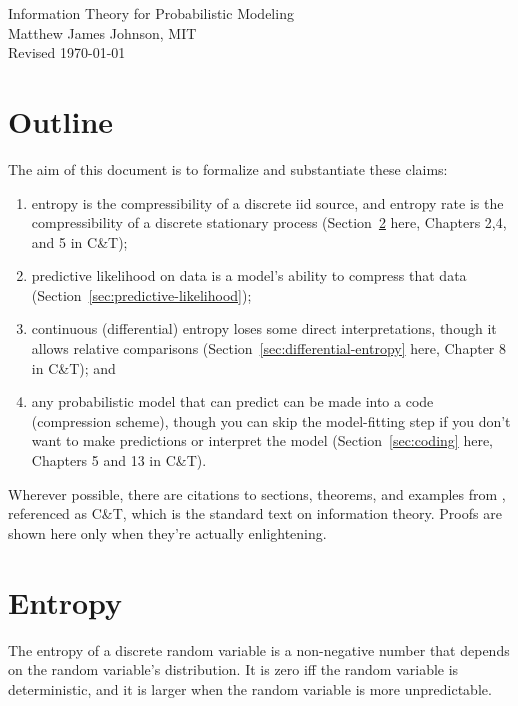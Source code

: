 \documentclass{article}
\begin{document}
    \begin{center}
        \Large
        Information Theory for Probabilistic Modeling\\
        \vspace{0.2in}
        \normalsize
        Matthew James Johnson, MIT\\
        \vspace{0.1in}
        \footnotesize
        Revised \today
    \end{center}

    \section{Outline}

    The aim of this document is to formalize and substantiate these claims:

    \begin{enumerate}
        \item entropy is the compressibility of a discrete iid
            source, and entropy rate is the
            compressibility of a discrete stationary process
            (Section~\ref{sec:entropy} here, Chapters 2,4, and 5 in C\&T);
        \item predictive likelihood on data is a model's ability to compress
            that data (Section~\ref{sec:predictive-likelihood});
        \item continuous (differential) entropy loses some direct
            interpretations, though it allows relative comparisons
            (Section~\ref{sec:differential-entropy} here, Chapter 8 in C\&T); and
        \item any probabilistic model that can predict can be made into a code
            (compression scheme), though you can skip the model-fitting step if
            you don't want to make predictions or interpret the model
            (Section~\ref{sec:coding} here, Chapters 5 and 13 in C\&T).
    \end{enumerate}

    Wherever possible, there are citations to sections, theorems, and examples
    from \citet{cover2006elements}, referenced as C\&T, which is the
    standard text on information theory. Proofs are shown here only when
    they're actually enlightening.

    \section{Entropy}%
    \label{sec:entropy}
    The entropy of a discrete random variable is a non-negative number that
    depends on the random variable's distribution. It is zero iff the random
    variable is deterministic, and it is larger when the random variable is
    more unpredictable.
\end{document}
